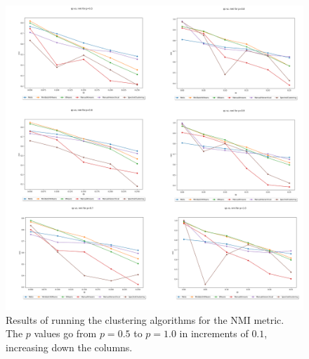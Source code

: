 \documentclass{article}
\begin{document}
\begin{figure}[H]
    \centering
    \includegraphics[width=1.15\textwidth]{results/results_nmi.png}
    \caption[Clustering NMI results]{Results of running the clustering algorithms for the NMI metric. The $p$ values go from $p=0.5$ to $p=1.0$ in increments of $0.1$, increasing down the columns.}
    \label{fig:results_nmi}
\end{figure}
\end{document}
